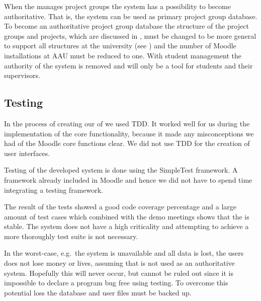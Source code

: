 When the \admpers{} manages project groups the system has a possibility to become authoritative.
That is, the system can be used as primary project group database. 
To become an authoritative project group database the structure of the project groups and projects, which are discussed in , must be changed to be more general to support all structures at the university (see ) and the number of Moodle installations at AAU must be reduced to one. 
With student management the authority of the system is removed and will only be a tool for students and their supervisors.




\subsection{Testing}
In the process of creating our \subsystem{} of \system{} we used TDD.
It worked well for us during the implementation of the core functionality, because it made any misconceptions we had of the Moodle core functions clear.
We did not use TDD for the creation of user interfaces.

Testing of the developed system is done using the SimpleTest framework. 
A framework already included in Moodle and hence we did not have to spend time integrating a testing framework.

The result of the tests showed a good code coverage percentage and a large amount of test cases which combined with the demo meetings shows that the \subsystem{} is stable. 
The system does not have a high criticality and attempting to achieve a more thoroughly test suite is not necessary. 

In the worst-case, e.g.\ the system is unavailable and all data is lost, the users does not lose money or lives, assuming that \system{} is not used as an authoritative system.
Hopefully this will never occur, but cannot be ruled out since it is impossible to declare a program bug free using testing.
To overcome this potential loss the database and user files must be backed up.
